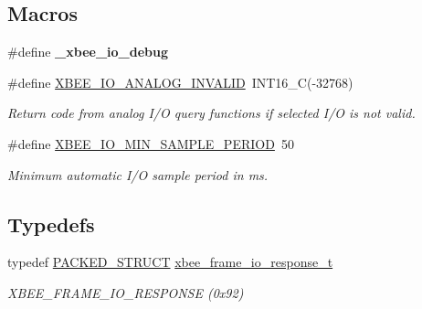 \subsection*{Macros}
\begin{DoxyCompactItemize}
\item 
\hypertarget{group__xbee__io_ga4bbb6c16a5af138ecfc8357d0675a5c4}{\#define {\bfseries \-\_\-xbee\-\_\-io\-\_\-debug}}\label{group__xbee__io_ga4bbb6c16a5af138ecfc8357d0675a5c4}

\item 
\hypertarget{group__xbee__io_ga196d5a808112b0c850b5b35c53b9cde1}{\#define \hyperlink{group__xbee__io_ga196d5a808112b0c850b5b35c53b9cde1}{X\-B\-E\-E\-\_\-\-I\-O\-\_\-\-A\-N\-A\-L\-O\-G\-\_\-\-I\-N\-V\-A\-L\-I\-D}~I\-N\-T16\-\_\-\-C(-\/32768)}\label{group__xbee__io_ga196d5a808112b0c850b5b35c53b9cde1}

\begin{DoxyCompactList}\small\item\em Return code from analog I/\-O query functions if selected I/\-O is not valid. \end{DoxyCompactList}\item 
\hypertarget{group__xbee__io_ga0e8b4392a59ce754f75251d04f3a1ac3}{\#define \hyperlink{group__xbee__io_ga0e8b4392a59ce754f75251d04f3a1ac3}{X\-B\-E\-E\-\_\-\-I\-O\-\_\-\-M\-I\-N\-\_\-\-S\-A\-M\-P\-L\-E\-\_\-\-P\-E\-R\-I\-O\-D}~50}\label{group__xbee__io_ga0e8b4392a59ce754f75251d04f3a1ac3}

\begin{DoxyCompactList}\small\item\em Minimum automatic I/\-O sample period in ms. \end{DoxyCompactList}\end{DoxyCompactItemize}
\subsection*{Typedefs}
\begin{DoxyCompactItemize}
\item 
typedef \hyperlink{group___s_x_a_ga4233297bd31be5c273d4fb0758cc54d7}{P\-A\-C\-K\-E\-D\-\_\-\-S\-T\-R\-U\-C\-T} \hyperlink{group__xbee__io_ga91bd181d244760611d0c5292f12bced8}{xbee\-\_\-frame\-\_\-io\-\_\-response\-\_\-t}
\begin{DoxyCompactList}\small\item\em X\-B\-E\-E\-\_\-\-F\-R\-A\-M\-E\-\_\-\-I\-O\-\_\-\-R\-E\-S\-P\-O\-N\-S\-E (0x92) \end{DoxyCompactList}\end{DoxyCompactItemize}
